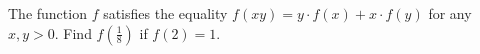 The function $f$ satisfies the equality ${f(xy) = y \cdot f(x) + x \cdot f(y)}$ for any $x, y > 0$. Find $f(\frac{1}{8})$ if $f(2)=1$.
